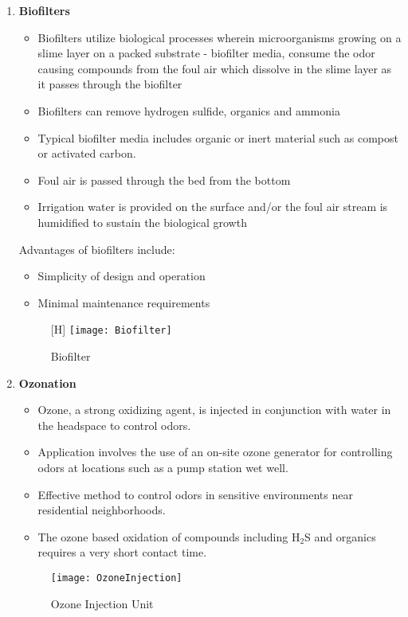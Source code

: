 \begin{enumerate}
\begin{figure}[htp]
	\end{figure}
\newpage	
\item \textbf{Biofilters}
\begin{itemize}
\item Biofilters utilize biological processes wherein microorganisms growing on a slime layer on a packed substrate - biofilter media, consume the odor causing compounds from the foul air which dissolve in the slime layer as it passes through the biofilter
\item Biofilters can remove hydrogen sulfide, organics and ammonia
\item Typical biofilter media includes organic or inert material such as compost or activated carbon.
\item Foul air is passed through the bed from the bottom
\item Irrigation water is provided on the surface and/or the foul air stream is humidified to sustain the biological growth
\end{itemize}
Advantages of biofilters include:
\begin{itemize}
\item Simplicity of design and operation
\item Minimal maintenance requirements
\end{itemize}


\begin{figure}
	\begin{center}[H]
		\texttt{[image: Biofilter]}
			\caption{Biofilter}
	\end{center}
	
	\end{figure}
\newpage	
\item \textbf{Ozonation}
\begin{itemize}
\item Ozone, a strong oxidizing agent, is injected in conjunction with water in the headspace to control odors.
\item Application involves the use of an on-site ozone generator for controlling odors at locations such as a pump station wet well.
\item Effective method to control odors in sensitive environments near residential neighborhoods.
\item The ozone based oxidation of compounds including H$_2$S and organics requires a very short contact time.
\end{itemize}

\begin{figure}[H]
	\begin{center}
		\texttt{[image: OzoneInjection]}
			\caption{Ozone Injection Unit}
	\end{center}
	
	\end{figure}

\end{enumerate}


